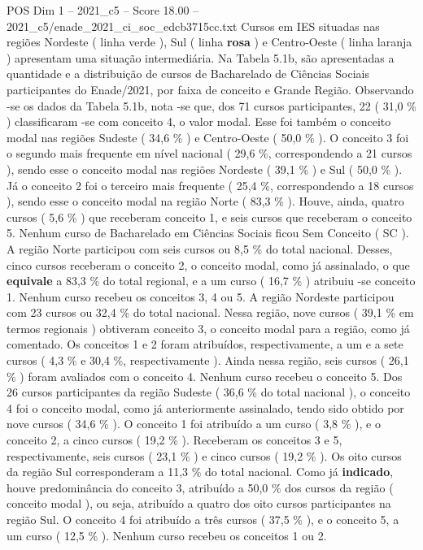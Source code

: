 \begin{textsample}{POS Dim 1 – 2021\_c5 – Score 18.00 – 2021\_c5/enade\_2021\_ci\_soc\_edcb3715cc.txt}
Cursos em IES situadas nas regiões Nordeste ( linha verde ), Sul ( linha \textbf{rosa} ) e Centro-Oeste ( linha laranja ) apresentam uma situação intermediária.
Na Tabela 5.1b, são apresentadas a quantidade e a distribuição de cursos de Bacharelado de Ciências Sociais participantes do Enade/2021, por faixa de conceito e Grande Região.
Observando -se os dados da Tabela 5.1b, nota -se que, dos 71 cursos participantes, 22 ( 31,0 \% ) classificaram -se com conceito 4, o valor modal.
Esse foi também o conceito modal nas regiões Sudeste ( 34,6 \% ) e Centro-Oeste ( 50,0 \% ).
O conceito 3 foi o segundo mais frequente em nível nacional ( 29,6 \%, correspondendo a 21 cursos ), sendo esse o conceito modal nas regiões Nordeste ( 39,1 \% ) e Sul ( 50,0 \% ).
Já o conceito 2 foi o terceiro mais frequente ( 25,4 \%, correspondendo a 18 cursos ), sendo esse o conceito modal na região Norte ( 83,3 \% ).
Houve, ainda, quatro cursos ( 5,6 \% ) que receberam conceito 1, e seis cursos que receberam o conceito 5.
Nenhum curso de Bacharelado em Ciências Sociais ficou Sem Conceito ( SC ).
A região Norte participou com seis cursos ou 8,5 \% do total nacional.
Desses, cinco cursos receberam o conceito 2, o conceito modal, como já assinalado, o que \textbf{equivale} a 83,3 \% do total regional, e a um curso ( 16,7 \% ) atribuiu -se conceito 1.
Nenhum curso recebeu os conceitos 3, 4 ou 5.
A região Nordeste participou com 23 cursos ou 32,4 \% do total nacional.
Nessa região, nove cursos ( 39,1 \% em termos regionais ) obtiveram conceito 3, o conceito modal para a região, como já comentado.
Os conceitos 1 e 2 foram atribuídos, respectivamente, a um e a sete cursos ( 4,3 \% e 30,4 \%, respectivamente ).
Ainda nessa região, seis cursos ( 26,1 \% ) foram avaliados com o conceito 4.
Nenhum curso recebeu o conceito 5.
Dos 26 cursos participantes da região Sudeste ( 36,6 \% do total nacional ), o conceito 4 foi o conceito modal, como já anteriormente assinalado, tendo sido obtido por nove cursos ( 34,6 \% ).
O conceito 1 foi atribuído a um curso ( 3,8 \% ), e o conceito 2, a cinco cursos ( 19,2 \% ).
Receberam os conceitos 3 e 5, respectivamente, seis cursos ( 23,1 \% ) e cinco cursos ( 19,2 \% ).
Os oito cursos da região Sul corresponderam a 11,3 \% do total nacional.
Como já \textbf{indicado}, houve predominância do conceito 3, atribuído a 50,0 \% dos cursos da região ( conceito modal ), ou seja, atribuído a quatro dos oito cursos participantes na região Sul.
O conceito 4 foi atribuído a três cursos ( 37,5 \% ), e o conceito 5, a um curso ( 12,5 \% ).
Nenhum curso recebeu os conceitos 1 ou 2.

\end{textsample}
